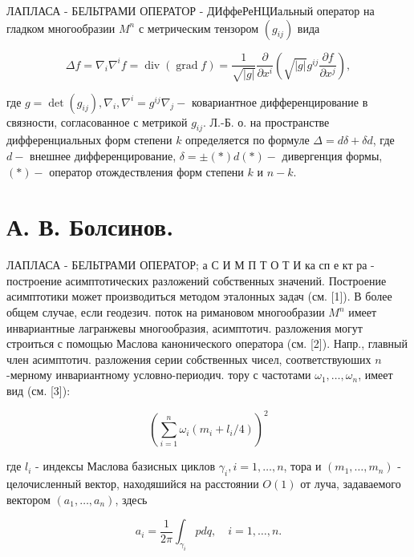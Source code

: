 \documentclass[10pt]{article}
\begin{document}
ЛАПЛАСА - БЕЛЬТРАМИ ОПЕРАТОР - ДИффеРеНЦИальный оператор на гладком многообразии $M^{n}$ с метрическим тензором $\left(g_{i j}\right)$ вида



\[

\Delta f=\nabla_{i} \nabla^{i} f=\operatorname{div}(\operatorname{grad} f)=\frac{1}{\sqrt{|g|}} \frac{\partial}{\partial x^{i}}\left(\sqrt{|g|} g^{i j} \frac{\partial f}{\partial x^{j}}\right),

\]



где $g=\operatorname{det}\left(g_{i j}\right), \nabla_{i}, \nabla^{i}=g^{i j} \nabla_{j}-$ ковариантное дифференцирование в связности, согласованное с метрикой $g_{i j}$. Л.-Б. о. на пространстве дифференциальных форм степени $k$ определяется по формуле $\Delta=d \delta+\delta d$, где $d-$ внешнее дифференцирование, $\delta= \pm(*) d(*)-$ дивергенция формы, $(*)-$ оператор отождествления форм степени $k$ и $n-k$.



\section{А. В. Болсинов.}

ЛАПЛАСА - БЕЛЬТРАМИ ОПЕРАТОР; а С И М П Т О Т И ка сп е кт ра - построение асимптотических разложений собственных значений. Построение асимптотики может производиться методом эталонных задач (см. [1]). В более общем случае, если геодезич. поток на римановом многообразии $M^{n}$ имеет инвариантные лагранжевы многообразия, асимптотич. разложения могут строиться с помощью Маслова канонического оператора (см. [2]). Напр., главный член асимптотич. разложения серии собственных чисел, соответствуюших $n$-мерному инвариантному условно-периодич. тору с частотами $\omega_{1}, \ldots, \omega_{n}$, имеет вид (см. [3]):



\[

\left(\sum_{i=1}^{n} \omega_{i}\left(m_{i}+l_{i} / 4\right)\right)^{2}

\]



где $l_{i}$ - индексы Маслова базисных циклов $\gamma_{i}, i=1, \ldots, n$, тора и $\left(m_{1}, \ldots, m_{n}\right)$ - целочисленный вектор, находяшийся на расстоянии $O(1)$ от луча, задаваемого вектором $\left(a_{1}, \ldots, a_{n}\right)$, здесь



\[

a_{i}=\frac{1}{2 \pi} \int_{\gamma_{i}} p d q, \quad i=1, \ldots, n .

\]
\end{document}
